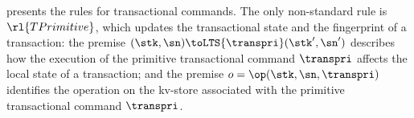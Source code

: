  presents the rules for transactional commands. 
The only non-standard rule is \( \rl{TPrimitive} \), which updates 
the transactional state and the fingerprint of a transaction: the premise 
$(\stk, \sn) \toLTS{\transpri} (\stk', \sn')$ describes how the
execution of  the primitive transactional command $\transpri$ affects the local state 
of a transaction; and the premise $o =\op(\stk, \sn, \transpri)$ identifies the operation on the 
kv-store associated with 
the primitive transactional command 
$\transpri$. 

